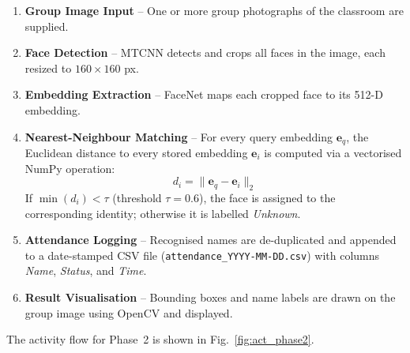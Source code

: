 \documentclass[conference]{IEEEtran}
\begin{document}
\begin{enumerate}
    \item \textbf{Group Image Input} -- One or more group photographs
          of the classroom are supplied.
    \item \textbf{Face Detection} -- MTCNN detects and crops all faces
          in the image, each resized to $160\times160$ px.
    \item \textbf{Embedding Extraction} -- FaceNet maps each cropped
          face to its 512-D embedding.
    \item \textbf{Nearest-Neighbour Matching} -- For every query
          embedding $\mathbf{e}_{q}$, the Euclidean distance to every
          stored embedding $\mathbf{e}_{i}$ is computed via a vectorised
          NumPy operation:
          \begin{equation}
              d_i = \|\mathbf{e}_q - \mathbf{e}_i\|_2
              \label{eq:euclid}
          \end{equation}
          If $\min(d_i) < \tau$ (threshold $\tau = 0.6$), the face is
          assigned to the corresponding identity; otherwise it is labelled
          \emph{Unknown}.
    \item \textbf{Attendance Logging} -- Recognised names are de-duplicated
          and appended to a date-stamped CSV file
          (\texttt{attendance\_YYYY-MM-DD.csv}) with columns
          \textit{Name}, \textit{Status}, and \textit{Time}.
    \item \textbf{Result Visualisation} -- Bounding boxes and name labels
          are drawn on the group image using OpenCV and displayed.
\end{enumerate}

The activity flow for Phase~2 is shown in Fig.~\ref{fig:act_phase2}.
\end{document}

